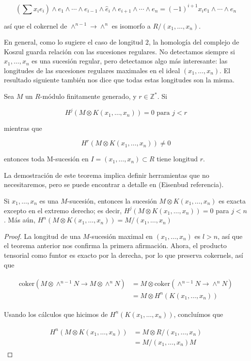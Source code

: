 $$ \left(\sum x_ie_i\right)\wedge e_1\wedge\cdots\wedge e_{i-1}\wedge \hat{e}_i\wedge e_{i+1}\wedge\cdots\wedge e_n = (-1)^{i+1}x_ie_1\wedge\cdots\wedge e_n$$

así que el cokernel de $\wedge^{n-1} \rightarrow \wedge^n$ es isomorfo a $R/(x_1,\dots,x_n)$.

En general, como lo sugiere el caso de longitud $2$, la homología del complejo de Koszul guarda relación con las sucesiones regulares. No detectamos siempre si $x_1, \dots, x_n$ es una sucesión regular, pero detectamos algo más interesante: las longitudes de las sucesiones regulares maximales en el ideal $(x_1, \dots, x_n)$. El resultado siguiente también nos dice que todas estas longitudes son la misma.

\begin{theorem}\label{sequence-length-r-theorem}
Sea $M$ un $R$-módulo finitamente generado, y $r \in \mathbb{Z}^*$. Si

$$ H^j(M\otimes K(x_1,\dots,x_n)) = 0 \textrm{ para } j < r $$

mientras que

$$ H^r(M\otimes K(x_1,\dots,x_n)) \neq 0 $$

entonces toda M-sucesión en $I = (x_1,\dots, x_n) \subset R$ tiene longitud $r$.
\end{theorem}

La demostración de este teorema implica definir herramientas que no necesitaremos, pero se puede encontrar a detalle en (Eisenbud referencia).

\begin{corollary}
Si $x_1,\dots,x_n$ es una $M$-sucesión, entonces la sucesión $M\otimes K(x_1,\dots, x_n)$ es exacta excepto en el extremo derecho; es decir, $H^j(M\otimes K(x_1, \dots, x_n)) = 0$ para $j < n$. Más aún, $H^n(M\otimes K(x_1, \dots, x_n)) = M/(x_1, \dots, x_n)$
\end{corollary}
\begin{proof}
La longitud de una $M$-sucesión maximal en $(x_1, \dots, x_n)$  es $l>n$, así que el teorema anterior nos confirma la primera afirmación. Ahora, el producto tensorial como funtor es exacto por la derecha, por lo que preserva cokernels, así que

\begin{align*}
\begin{split}
\textrm{coker}(M\otimes\wedge^{n-1}N\rightarrow M\otimes\wedge^nN) & = M\otimes \textrm{coker}(\wedge^{n-1}N\rightarrow \wedge^nN)\\
& = M \otimes H^n(K(x_1,\dots,x_n))
\end{split}
\end{align*}

Usando los cálculos que hicimos de $H^n(K(x_1,\dots,x_n))$, concluímos que

\begin{align*}
\begin{split}
H^n(M\otimes K(x_1,\dots,x_n)) & = M\otimes R/(x_1,\dots,x_n)\\
& = M/(x_1,\dots,x_n)M
\end{split}
\end{align*}

\end{proof}

